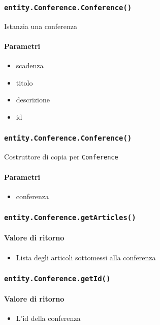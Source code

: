 \subsubsection{\texttt{entity.Conference.Conference()}}
Istanzia una conferenza
\paragraph{Parametri}
\begin{itemize}
\item scadenza
\item titolo
\item descrizione
\item id
\end{itemize}

\subsubsection{\texttt{entity.Conference.Conference()}}
Costruttore di copia per \texttt{Conference}
\paragraph{Parametri}
\begin{itemize}
\item conferenza
\end{itemize}

\subsubsection{\texttt{entity.Conference.getArticles()}}
\paragraph{Valore di ritorno}
\begin{itemize}
\item Lista degli articoli sottomessi alla conferenza
\end{itemize}
\subsubsection{\texttt{entity.Conference.getId()}}
\paragraph{Valore di ritorno}
\begin{itemize}
\item L'id della conferenza
\end{itemize}
